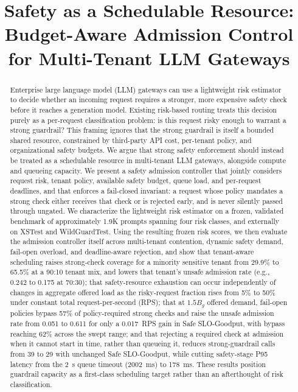 \documentclass[conference]{IEEEtran}
\newcommand{\Bg}{B_g}
\begin{document}
\title{Safety as a Schedulable Resource: Budget-Aware Admission Control for Multi-Tenant LLM Gateways}

\author{
}

\maketitle

\begin{abstract}
Enterprise large language model (LLM) gateways can use a lightweight risk estimator to decide whether an incoming request requires a stronger, more expensive safety check before it reaches a generation model. Existing risk-based routing treats this decision purely as a per-request classification problem: is this request risky enough to warrant a strong guardrail? This framing ignores that the strong guardrail is itself a bounded shared resource, constrained by third-party API cost, per-tenant policy, and organizational safety budgets. We argue that strong safety enforcement should instead be treated as a schedulable resource in multi-tenant LLM gateways, alongside compute and queueing capacity. We present a safety admission controller that jointly considers request risk, tenant policy, available safety budget, queue load, and per-request deadlines, and that enforces a fail-closed invariant: a request whose policy mandates a strong check either receives that check or is rejected early, and is never silently passed through ungated. We characterize the lightweight risk estimator on a frozen, validated benchmark of approximately 1.9K prompts spanning four risk classes, and externally on XSTest and WildGuardTest. Using the resulting frozen risk scores, we then evaluate the admission controller itself across multi-tenant contention, dynamic safety demand, fail-open overload, and deadline-aware rejection, and show that tenant-aware scheduling raises strong-check coverage for a minority sensitive tenant from 29.9\% to 65.5\% at a 90:10 tenant mix, and lowers that tenant's unsafe admission rate (e.g., 0.242 to 0.175 at 70:30); that safety-resource exhaustion can occur independently of changes in aggregate offered load as the risky-request fraction rises from 5\% to 50\% under constant total request-per-second (RPS); that at $1.5\Bg$ offered demand, fail-open policies bypass 57\% of policy-required strong checks and raise the unsafe admission rate from 0.051 to 0.611 for only a 0.017~RPS gain in Safe SLO-Goodput, with bypass reaching 62\% across the swept range; and that rejecting a required check at admission when it cannot start in time, rather than queueing it, reduces strong-guardrail calls from 39 to 29 with unchanged Safe SLO-Goodput, while cutting safety-stage P95 latency from the 2~s queue timeout (2002~ms) to 178~ms. These results position guardrail capacity as a first-class scheduling target rather than an afterthought of risk classification.
\end{abstract}
\end{document}

